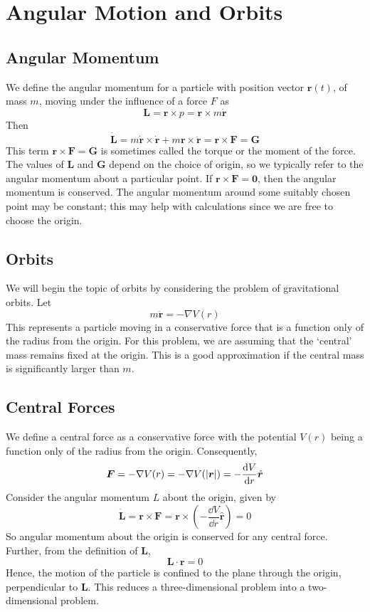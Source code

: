 \documentclass{article}
\begin{document}
\section{Angular Motion and Orbits}
\subsection{Angular Momentum}
We define the angular momentum for a particle with position vector $\bm r(t)$, of mass $m$, moving under the influence of a force $F$ as
\[ \bm L = \bm r \times p = \bm r \times m \dot{\bm r} \]
Then
\[ \dot{\bm L} = m\dot{\bm r} \times \dot{\bm r} + m\bm r \times \ddot{\bm r} = \bm r \times \bm F = \bm G \]
This term $\bm r \times \bm F = \bm G$ is sometimes called the torque or the moment of the force. The values of $\bm L$ and $\bm G$ depend on the choice of origin, so we typically refer to the angular momentum about a particular point. If $\bm r \times \bm F = \bm 0$, then the angular momentum is conserved. The angular momentum around some suitably chosen point may be constant; this may help with calculations since we are free to choose the origin.

\subsection{Orbits}
We will begin the topic of orbits by considering the problem of gravitational orbits. Let
\[ m\ddot{\bm r} = -\nabla V(r) \]
This represents a particle moving in a conservative force that is a function only of the radius from the origin. For this problem, we are assuming that the `central' mass remains fixed at the origin. This is a good approximation if the central mass is significantly larger than $m$.

\subsection{Central Forces}
We define a central force as a conservative force with the potential $V(r)$ being a function only of the radius from the origin. Consequently,
\[ \bm F = -\nabla V(r) = -\nabla V(\abs{\bm r}) = -\frac{\dd V}{\dd r}\hat{\bm r} \]
Consider the angular momentum $L$ about the origin, given by
\[ \dot{\bm L} = \bm r \times \bm F = \bm r \times \left(-\frac{\dd V}{\dd r}\hat{\bm r}\right) = 0 \]
So angular momentum about the origin is conserved for any central force. Further, from the definition of $\bm L$,
\[ \bm L \cdot \bm r = 0 \]
Hence, the motion of the particle is confined to the plane through the origin, perpendicular to $\bm L$. This reduces a three-dimensional problem into a two-dimensional problem.
\end{document}
